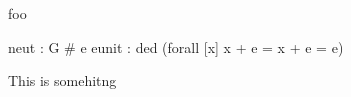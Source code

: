 \begin{module}{foo}
\begin{mmt}[axioms]
  neut : G \# e
  eunit : ded (forall [x] x + e = x + e = e)
\end{mmt}
This is somehitng
\end{module}
